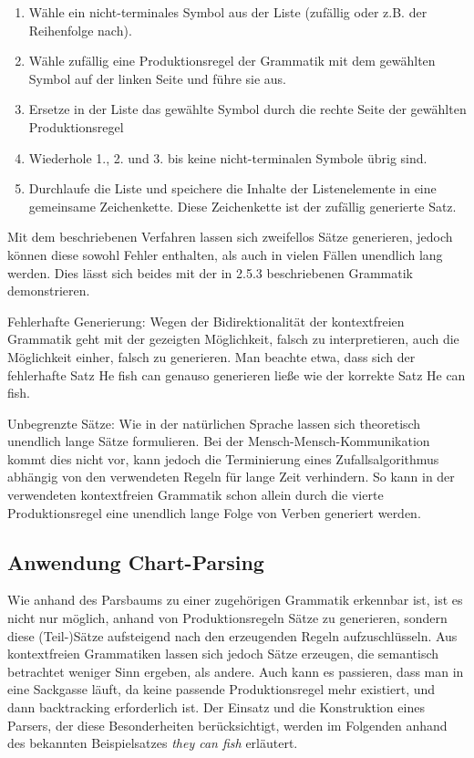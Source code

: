 \documentclass[12pt]{report}
\begin{document}
\begin{enumerate}
\item Wähle ein nicht-terminales Symbol aus der Liste (zufällig oder z.B. der Reihenfolge nach).
\item Wähle zufällig eine Produktionsregel der Grammatik mit dem gewählten Symbol auf der linken Seite und führe sie aus. 
\item Ersetze in der Liste das gewählte Symbol durch die rechte Seite der gewählten Produktionsregel
\item Wiederhole 1., 2. und 3. bis keine nicht-terminalen Symbole übrig sind. 
\item Durchlaufe die Liste und speichere die Inhalte der Listenelemente in eine gemeinsame Zeichenkette. Diese Zeichenkette ist der zufällig generierte Satz. 
\end{enumerate}

Mit dem beschriebenen Verfahren lassen sich zweifellos Sätze generieren, jedoch können diese sowohl Fehler enthalten, als auch in vielen Fällen unendlich lang werden. Dies lässt sich beides mit der in 2.5.3 beschriebenen Grammatik demonstrieren. 

Fehlerhafte Generierung: Wegen der Bidirektionalität der kontextfreien Grammatik geht mit der gezeigten Möglichkeit, falsch zu interpretieren, auch die Möglichkeit einher, falsch zu generieren. Man beachte etwa, dass sich der fehlerhafte Satz \glqq  He fish can\grqq{} genauso generieren ließe wie der korrekte Satz \glqq  He can fish\grqq{}.

Unbegrenzte Sätze: Wie in der natürlichen Sprache lassen sich theoretisch unendlich lange Sätze formulieren. Bei der Mensch-Mensch-Kommunikation kommt dies nicht vor, kann jedoch die Terminierung eines Zufallsalgorithmus abhängig von den verwendeten Regeln für lange Zeit verhindern. So kann in der verwendeten kontextfreien Grammatik schon allein durch die vierte Produktionsregel eine unendlich lange Folge von Verben generiert werden.

\subsection{Anwendung Chart-Parsing}
Wie anhand des Parsbaums zu einer zugehörigen Grammatik erkennbar ist, ist es nicht nur möglich, anhand von Produktionsregeln Sätze zu generieren, sondern diese (Teil-)Sätze aufsteigend nach den erzeugenden Regeln aufzuschlüsseln. Aus kontextfreien Grammatiken lassen sich jedoch Sätze erzeugen, die semantisch betrachtet weniger Sinn ergeben, als andere. Auch kann es passieren, dass man in eine Sackgasse läuft, da keine passende Produktionsregel mehr existiert, und dann backtracking erforderlich ist. Der Einsatz und die Konstruktion eines Parsers, der diese Besonderheiten berücksichtigt, werden im Folgenden anhand des bekannten Beispielsatzes \textit{they can fish} erläutert.
\end{document}

